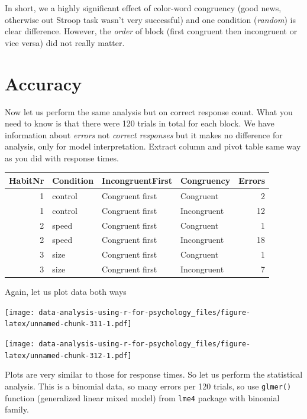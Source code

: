 \documentclass[
]{book}
\begin{document}
In short, we a highly significant effect of color-word congruency (good news, otherwise out Stroop task wasn't very successful) and one condition (\emph{random}) is clear difference. However, the \emph{order} of block (first congruent then incongruent or vice versa) did not really matter.

\hypertarget{accuracy-1}{%
\section{Accuracy}\label{accuracy-1}}

Now let us perform the same analysis but on correct response count. What you need to know is that there were 120 trials in total for each block. We have information about \emph{errors} not \emph{correct responses} but it makes no difference for analysis, only for model interpretation. Extract column and pivot table same way as you did with response times.

\begin{tabular}{r|l|l|l|r}
\hline
HabitNr & Condition & IncongruentFirst & Congruency & Errors\\
\hline
1 & control & Congruent first & Congruent & 2\\
\hline
1 & control & Congruent first & Incongruent & 12\\
\hline
2 & speed & Congruent first & Congruent & 1\\
\hline
2 & speed & Congruent first & Incongruent & 18\\
\hline
3 & size & Congruent first & Congruent & 1\\
\hline
3 & size & Congruent first & Incongruent & 7\\
\hline
\end{tabular}

Again, let us plot data both ways

\texttt{[image: data-analysis-using-r-for-psychology\_files/figure-latex/unnamed-chunk-311-1.pdf]}

\texttt{[image: data-analysis-using-r-for-psychology\_files/figure-latex/unnamed-chunk-312-1.pdf]}

Plots are very similar to those for response times. So let us perform the statistical analysis. This is a binomial data, so many errors per 120 trials, so use \texttt{glmer()} function (generalized linear mixed model) from \texttt{lme4} package with binomial family.
\end{document}
